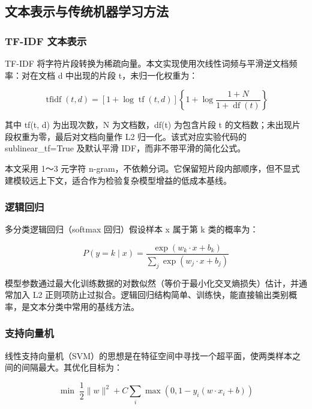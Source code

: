 \FloatBarrier\subsection{文本表示与传统机器学习方法}

\subsubsection{TF-\allowbreak{}IDF 文本表示}

TF-IDF 将字符片段转换为稀疏向量。本文实现使用次线性词频与平滑逆文档频率：对在文档 d 中出现的片段 t，未归一化权重为：

\begin{equation}\operatorname{tfidf}(t,d)=[1+\log\operatorname{tf}(t,d)]\left\{1+\log\frac{1+N}{1+\operatorname{df}(t)}\right\}\tag{2-1}\label{eq:2-1}\end{equation}

其中 tf(t, d) 为出现次数，N 为文档数，df(t) 为包含片段 t 的文档数；未出现片段权重为零，最后对文档向量作 L2 归一化。该式对应实验代码的 sublinear\_tf=True 及默认平滑 IDF，而非不带平滑的简化公式。

本文采用 1～3 元字符 n-gram，不依赖分词。它保留短片段内部顺序，但不显式建模较远上下文，适合作为检验复杂模型增益的低成本基线。

\subsubsection{逻辑回归}

多分类逻辑回归（softmax 回归）假设样本 x 属于第 k 类的概率为：

\begin{equation}P(y=k\mid x)=\frac{\exp(w_k\cdot x+b_k)}{\sum_j\exp(w_j\cdot x+b_j)}\tag{2-2}\label{eq:2-2}\end{equation}

模型参数通过最大化训练数据的对数似然（等价于最小化交叉熵损失）估计，并通常加入 L2 正则项防止过拟合。逻辑回归结构简单、训练快，能直接输出类别概率，是文本分类中常用的基线方法。

\subsubsection{支持向量机}

线性支持向量机（SVM）的思想是在特征空间中寻找一个超平面，使两类样本之间的间隔最大。其优化目标为：

\begin{equation}\min\;\frac12\lVert w\rVert^2+C\sum_i\max\!\left(0,1-y_i(w\cdot x_i+b)\right)\tag{2-3}\label{eq:2-3}\end{equation}

